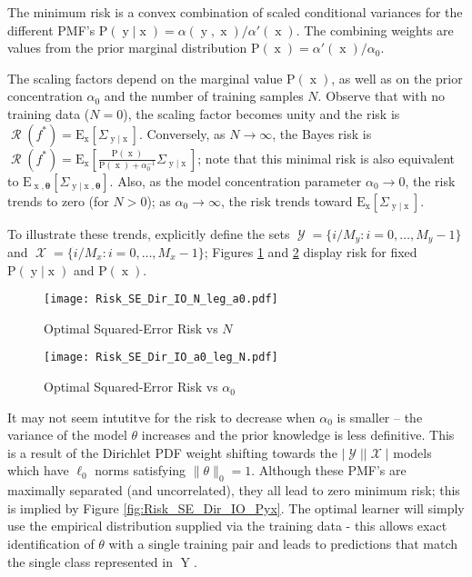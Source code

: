 \documentclass[12pt]{report}
\DeclareMathOperator{\xrm}{\mathrm{x}}
\DeclareMathOperator{\yrm}{\mathrm{y}}
\DeclareMathOperator{\Yrm}{\mathrm{Y}}
\DeclareMathOperator{\Xcal}{\mathcal{X}}
\DeclareMathOperator{\Ycal}{\mathcal{Y}}
\DeclareMathOperator{\Rcal}{\mathcal{R}}
\begin{document}
The minimum risk is a convex combination of scaled conditional variances for the different PMF's $\text{P}(\yrm | \xrm) = \alpha(\yrm,\xrm)/\alpha'(\xrm)$. The combining weights are values from the prior marginal distribution $\text{P}(\xrm) = \alpha'(\xrm)/\alpha_0$. 

The scaling factors depend on the marginal value $\text{P}(\xrm)$, as well as on the prior concentration $\alpha_0$ and the number of training samples $N$. Observe that with no training data ($N = 0$), the scaling factor becomes unity and the risk is $\Rcal(f^*) = \text{E}_{\xrm} \left[ \Sigma_{\yrm | \xrm} \right]$. Conversely, as $N \to \infty$, the Bayes risk is $\Rcal(f^*) = \text{E}_{\xrm} \left[ \frac{\text{P}(\xrm)}{\text{P}(\xrm) + \alpha_0^{-1}} \Sigma_{\yrm | \xrm} \right]$; note that this minimal risk is also equivalent to $\text{E}_{\xrm,\bm{\theta}} \left[ \Sigma_{\yrm | \xrm,\bm{\theta}} \right]$. Also, as the model concentration parameter $\alpha_0 \to 0$, the risk trends to zero (for $N > 0$); as $\alpha_0 \to \infty$, the risk trends toward $\text{E}_{\xrm} \left[ \Sigma_{\yrm | \xrm} \right]$.

To illustrate these trends, explicitly define the sets $\Ycal = \{ i/M_y : i = 0,\ldots,M_y-1 \}$ and $\Xcal = \{ i/M_x : i = 0,\ldots,M_x-1 \}$; Figures \ref{fig:Risk_SE_Dir_IO_N_leg_a0} and \ref{fig:Risk_SE_Dir_IO_a0_leg_N} display risk for fixed $\text{P}(\yrm|\xrm)$ and $\text{P}(\xrm)$.

\begin{figure}
\centering
\texttt{[image: Risk\_SE\_Dir\_IO\_N\_leg\_a0.pdf]}
\caption{Optimal Squared-Error Risk vs $N$}
\label{fig:Risk_SE_Dir_IO_N_leg_a0}
\end{figure}

\begin{figure}
\centering
\texttt{[image: Risk\_SE\_Dir\_IO\_a0\_leg\_N.pdf]}
\caption{Optimal Squared-Error Risk vs $\alpha_0$}
\label{fig:Risk_SE_Dir_IO_a0_leg_N}
\end{figure}

It may not seem intutitve for the risk to decrease when $\alpha_0$ is smaller -- the variance of the model $\theta$ increases and the prior knowledge is less definitive. This is a result of the Dirichlet PDF weight shifting towards the $|\Ycal||\Xcal|$ models which have $\ell_0$ norms satisfying $\| \theta \|_0 = 1$. Although these PMF's are maximally separated (and uncorrelated), they all lead to zero minimum risk; this is implied by Figure \ref{fig:Risk_SE_Dir_IO_Pyx}. The optimal learner will simply use the empirical distribution supplied via the training data - this allows exact identification of $\theta$ with a single training pair and leads to predictions that match the single class represented in $\Yrm$.
\end{document}
